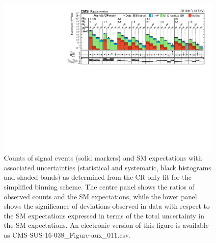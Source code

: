 \begin{figure}[h!]
  \centering
  \includegraphics[width=0.95\linewidth]{Supplementary/CMS-SUS-16-038_Figure-aux_011} 
  \caption{Counts of signal events (solid markers) and SM expectations
    with associated uncertainties (statistical and systematic, black
    histograms and shaded bands) 
    as determined from the CR-only fit
    for the simplified binning scheme.
    The centre panel shows the ratios of
    observed counts and the SM expectations, while the lower panel
    shows the significance of deviations observed in data with respect
    to the SM expectations expressed in terms of the total uncertainty
    in the SM expectations.
    An electronic version of this figure is available as CMS-SUS-16-038\_Figure-aux\_011.csv.
    }
  \label{fig:aggregated_results_cr-only}
\end{figure}


